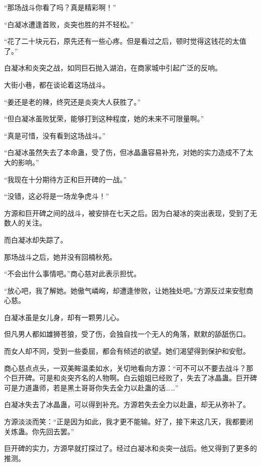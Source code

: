 
\begin{this_body}

“那场战斗你看了吗？真是精彩啊！”

“白凝冰遭逢首败，炎突也胜的并不轻松。”

“花了二十块元石，原先还有一些心疼。但是看过之后，顿时觉得这钱花的太值了。”

白凝冰和炎突之战，如同巨石抛入湖泊，在商家城中引起广泛的反响。

大街小巷，都在谈论着这场战斗。

“姜还是老的辣，终究还是炎突大人获胜了。”

“但白凝冰虽败犹荣，能够打到这种程度，她的未来不可限量啊。”

“真是可惜，没有看到这场战斗。”

“白凝冰虽然失去了本命蛊，受了伤，但冰晶蛊容易补充，对她的实力造成不了太大的影响。”

“我现在十分期待方正和巨开碑的一战。”

“没错，这必将是一场龙争虎斗！”

方源和巨开碑之间的战斗，被安排在七天之后。因为白凝冰的突出表现，受到了无数人的关注。

而白凝冰却失踪了。

那场战斗之后，她并没有回楠秋苑。

“不会出什么事情吧。”商心慈对此表示担忧。

“放心吧，我了解她。她傲气嶙峋，却遭逢惨败，让她独处吧。”方源反过来安慰商心慈。

白凝冰虽是女儿身，却有一颗男儿心。

但凡男人都如雄狮苍狼，受了伤，会独自找一个无人的角落，默默的舔舐伤口。

而女人却不同，受到一些委屈，都会有倾述的欲望。她们渴望得到保护和安慰。

商心慈点点头，一双美眸温柔如水，关切地看向方源：“可不可以不要去战斗？那个巨开碑。可是和炎突齐名的人物啊。白云姐姐已经败了，失去了冰晶蛊。巨开碑可是力道蛊师，若是黑土哥哥你失去全力以赴蛊的话……”

白凝冰失去了冰晶蛊，可以得到补充。方源若失去全力以赴蛊，却无从弥补了。

方源淡淡而笑：“正是因为如此，我才更不能输。好了，接下来这几天，我都要闭关炼蛊。你先回去罢。”

巨开碑的实力，方源早就打探过了。经过白凝冰和炎突一战后。他又得到了更多的推测。


\end{this_body}
